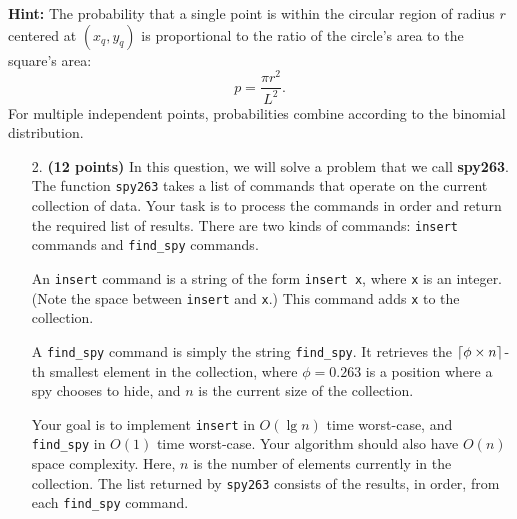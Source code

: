 \documentclass{assignment-263}
\begin{document}
\bigskip

\noindent \textbf{Hint:} The probability that a single point is within the circular region of radius $r$ centered at $(x_q, y_q)$ is proportional to the ratio of the circle's area to the square's area:
\[
p = \frac{\pi r^2}{L^2}.
\]
For multiple independent points, probabilities combine according to the binomial distribution.

\program

\begin{enumerate}
\item[2.] \textbf{(12 points)}
    In this question, we will solve a problem that we call {\bf spy263}.
    The function \verb|spy263| takes a list of commands that
    operate on the current collection of data.
    Your task is to process the commands in order and return the required list of results.
    There are two kinds of commands: \verb|insert| commands and \verb|find_spy| commands.

    An \verb|insert| command is a string of the form \verb|insert x|,
    where \verb|x| is an integer. (Note the space between \verb|insert| and \verb|x|.)
    This command adds \verb|x| to the collection.

    A \verb|find_spy| command is simply the string \verb|find_spy|.
    It retrieves the $\left \lceil \phi\times n \right \rceil$-th smallest element in the collection, where 
    $\phi=0.263$ is a position where a spy chooses to hide,
    and $n$ is the current size of the collection.

    Your goal is to implement \verb|insert| in $O(\lg n)$ time worst-case, and 
    \verb|find_spy| in $O(1)$ time worst-case.
    Your algorithm should also have $O(n)$ space complexity.
    Here, $n$ is the number of elements currently in the collection.
    The list returned by \verb|spy263| consists of the results, in order,
    from each \verb|find_spy| command.


\end{enumerate}
\end{document}

